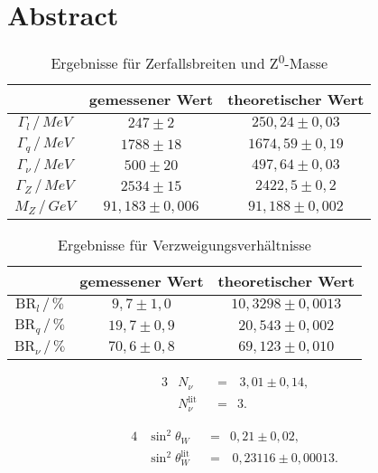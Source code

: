 \section*{Abstract}



\begin{table}[bh]
	\centering
	\begin{tabular}{c|cc}
		&gemessener Wert&theoretischer Wert\\\hline
		$\Gamma_l\,/\,\si{MeV}$&$247\pm2$&$250,24\pm0,03$\\
		$\Gamma_q\,/\,\si{MeV}$&$1788\pm18$&$1674,59\pm0,19$\\
		$\Gamma_\nu\,/\,\si{MeV}$&$500\pm20$&$497,64\pm0,03$\\
		$\Gamma_Z\,/\,\si{MeV}$&$2534\pm15$&$2422,5\pm0,2$\\
		$M_Z\,/\,\si{GeV}$&$91,183\pm0,006$&$91,188\pm0,002$
	\end{tabular}
	\caption{Ergebnisse für Zerfallsbreiten und Z\textsuperscript0-Masse}
	\label{tab:abstractergebnisse}
\end{table}
\begin{table}[bh]
	\centering
	\begin{tabular}{c|cc}
		&gemessener Wert&theoretischer Wert\\\hline
		$\mathrm{BR}_l\,/\,\si{\%}$&$9,7\pm1,0$&$10,3298\pm0,0013$\\
		$\mathrm{BR}_q\,/\,\si{\%}$&$19,7\pm0,9$&$20,543\pm0,002$\\
		$\mathrm{BR}_\nu\,/\,\si{\%}$&$70,6\pm0,8$&$69,123\pm0,010$
	\end{tabular}
	\caption{Ergebnisse für Verzweigungsverhältnisse}
	\label{tab:abstractbranch}
\end{table}

\begin{alignat}{3}
&N_\nu&&=&\,3,01\pm0,14\text{,}\\
&N_\nu^\text{lit}&&=&3\text{.}
\end{alignat} 

\begin{alignat}{4}
&\sin^2\theta_W&&=&0,21\pm0,02\text{,}\\
&\sin^2\theta_W^\text{lit}&&=&\,0,23116\pm0,00013\text{.}
\end{alignat}